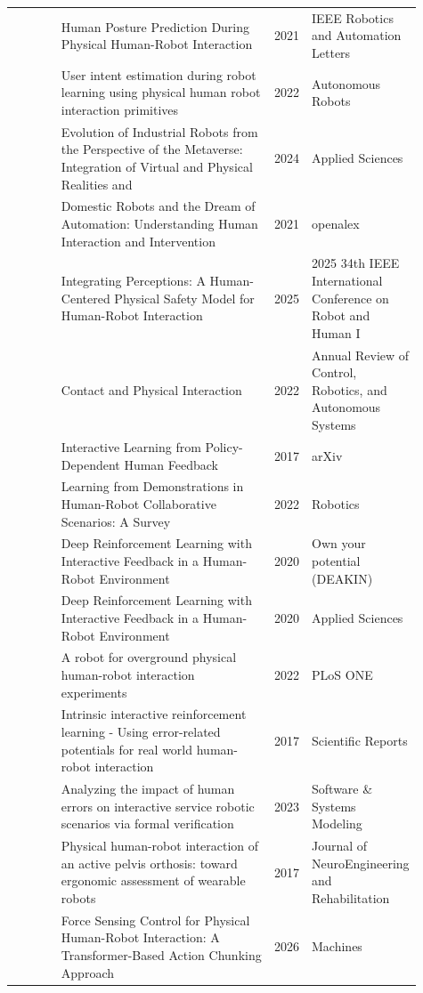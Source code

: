 \documentclass{article}
\begin{document}
\begin{center}
\begin{longtable}{p{0.12\linewidth}p{0.53\linewidth}p{0.08\linewidth}p{0.18\linewidth}}
\citep{pool85_34} & Human Posture Prediction During Physical Human-Robot Interaction & 2021 & IEEE Robotics and Automation Letters\\
\citep{pool85_35} & User intent estimation during robot learning using physical human robot interaction primitives & 2022 & Autonomous Robots\\
\citep{pool85_36} & Evolution of Industrial Robots from the Perspective of the Metaverse: Integration of Virtual and Physical Realities and  & 2024 & Applied Sciences\\
\citep{pool85_37} & Domestic Robots and the Dream of Automation: Understanding Human Interaction and Intervention & 2021 & openalex\\
\citep{pool85_38} & Integrating Perceptions: A Human-Centered Physical Safety Model for Human-Robot Interaction & 2025 & 2025 34th IEEE International Conference on Robot and Human I\\
\citep{pool85_39} & Contact and Physical Interaction & 2022 & Annual Review of Control, Robotics, and Autonomous Systems\\
\citep{pool85_40} & Interactive Learning from Policy-Dependent Human Feedback & 2017 & arXiv\\
\citep{pool85_41} & Learning from Demonstrations in Human-Robot Collaborative Scenarios: A Survey & 2022 & Robotics\\
\citep{pool85_42} & Deep Reinforcement Learning with Interactive Feedback in a Human-Robot Environment & 2020 & Own your potential (DEAKIN)\\
\citep{pool85_43} & Deep Reinforcement Learning with Interactive Feedback in a Human-Robot Environment & 2020 & Applied Sciences\\
\citep{pool85_44} & A robot for overground physical human-robot interaction experiments & 2022 & PLoS ONE\\
\citep{pool85_45} & Intrinsic interactive reinforcement learning - Using error-related potentials for real world human-robot interaction & 2017 & Scientific Reports\\
\citep{pool85_46} & Analyzing the impact of human errors on interactive service robotic scenarios via formal verification & 2023 & Software \& Systems Modeling\\
\citep{pool85_47} & Physical human-robot interaction of an active pelvis orthosis: toward ergonomic assessment of wearable robots & 2017 & Journal of NeuroEngineering and Rehabilitation\\
\citep{pool85_48} & Force Sensing Control for Physical Human-Robot Interaction: A Transformer-Based Action Chunking Approach & 2026 & Machines\\
\bottomrule
\end{longtable}
\normalsize
\end{center}
\end{document}
